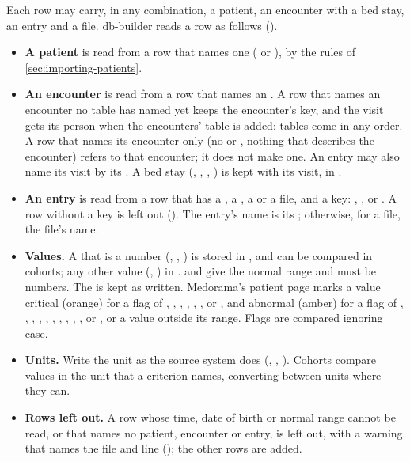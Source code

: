 Each row may carry, in any combination, a patient, an encounter with a bed stay, an entry and a
file. db-builder reads a row as follows ().
\begin{itemize}
\item \textbf{A patient} is read from a row that names one ( or ),
  by the rules of \cref{sec:importing-patients}.
\item \textbf{An encounter} is read from a row that names an . A row that
  names an encounter no table has named yet keeps the encounter's key, and the visit gets its
  person when the encounters' table is added: tables come in any order. A row that names its
  encounter only (no  or , nothing that describes the encounter)
  refers to that encounter; it does not make one. An entry may also name its visit by its
  . A bed stay (, , , ) is
  kept with its visit, in .
\item \textbf{An entry} is read from a row that has a , a , a 
  or a file, and a key: , ,  or . A row
  without a key is left out (). The
  entry's name is its ; otherwise, for a file, the file's name.
\item \textbf{Values.} A  that is a number (, , ) is
  stored in , and can be compared in cohorts; any other value (,
  ) in .  and  give the normal range
  and must be numbers. The  is kept as written. Medorama's patient page marks a value
  critical (orange) for a flag of , , , , ,
  ,  or \code{!}, and abnormal (amber) for a flag of , ,
  , , , , , , ,
  ,  or , or a value outside its range. Flags are compared
  ignoring case.
\item \textbf{Units.} Write the unit as the source system does (, ,
  ). Cohorts compare values in the unit that a criterion names, converting between
  units where they can.
\item \textbf{Rows left out.} A row whose time, date of birth or normal range cannot be read, or
  that names no patient, encounter or entry, is left out, with a warning that names the file and
  line (); the other rows are added.
\end{itemize}

